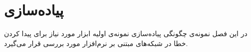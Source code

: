 \chapter{پیاده‌سازی}
در این فصل نمونه‌ی چگونگی پیاده‌سازی نمونه‌ی اولیه
ابزار مورد 
نیاز برای پیدا کردن خطا در شبکه‌های مبتنی بر نرم‌افزار مورد بررسی 
قرار می‌گیرد.

